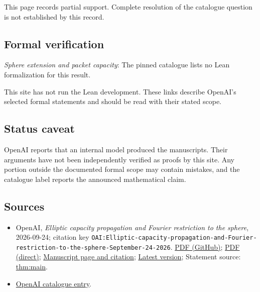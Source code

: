 \documentclass[11pt]{article}
\begin{document}
This page records partial support. Complete resolution of the catalogue question is not established by this record.

\subsection{Formal verification}
\textit{Sphere extension and packet capacity}: The pinned catalogue lists no Lean formalization for this result.

This site has not run the Lean development. These links describe OpenAI’s selected formal statements and should be read with their stated scope.

\subsection{Status caveat}
OpenAI reports that an internal model produced the manuscripts. Their arguments have not been independently verified as proofs by this site. Any portion outside the documented formal scope may contain mistakes, and the catalogue label reports the announced mathematical claim.

\subsection{Sources}
\begin{itemize}
\item OpenAI, \emph{Elliptic capacity propagation and Fourier restriction to the sphere}, 2026-09-24; citation key \texttt{OAI:Elliptic-capacity-propagation-and-Fourier-restriction-to-the-sphere-September-24-2026}. \href{https://github.com/openai/math/blob/adc7f1241b42e322a6451854ab7e4b4c146bf78a/preprints/Elliptic-capacity-propagation-and-Fourier-restriction-to-the-sphere-September-24-2026/Elliptic-capacity-propagation-and-Fourier-restriction-to-the-sphere-September-24-2026.pdf}{PDF (GitHub)}; \href{https://github.com/openai/math/raw/adc7f1241b42e322a6451854ab7e4b4c146bf78a/preprints/Elliptic-capacity-propagation-and-Fourier-restriction-to-the-sphere-September-24-2026/Elliptic-capacity-propagation-and-Fourier-restriction-to-the-sphere-September-24-2026.pdf}{PDF (direct)}; \href{https://github.com/openai/math/blob/adc7f1241b42e322a6451854ab7e4b4c146bf78a/preprints/Elliptic-capacity-propagation-and-Fourier-restriction-to-the-sphere-September-24-2026/README.md}{Manuscript page and citation}; \href{https://github.com/openai/math/blob/main/preprints/Elliptic-capacity-propagation-and-Fourier-restriction-to-the-sphere-September-24-2026/Elliptic-capacity-propagation-and-Fourier-restriction-to-the-sphere-September-24-2026.pdf}{Latest version}; Statement source: \href{https://github.com/openai/math/blob/adc7f1241b42e322a6451854ab7e4b4c146bf78a/preprints/Elliptic-capacity-propagation-and-Fourier-restriction-to-the-sphere-September-24-2026/build/sections/00-introduction.tex\#L21}{thm:main}.
\item \href{https://github.com/openai/math/blob/adc7f1241b42e322a6451854ab7e4b4c146bf78a/CONTENTS.md}{OpenAI catalogue entry}.
\end{itemize}
\end{document}
